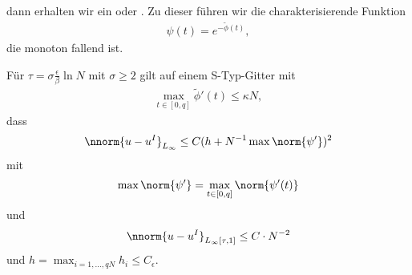 dann erhalten wir ein  oder . 
Zu dieser führen wir die charakterisierende Funktion
\begin{align*}
  \psi(t) = e^{- \tilde \phi (t)}, 
\end{align*}
die monoton fallend ist. 
\begin{folgerung}\label{6-13}
Für $\tau = \sigma \frac \epsilon \beta \ln N$ mit $\sigma \geq 2$ gilt auf einem S-Typ-Gitter mit
\begin{align*}
  \max_{t \in [0, q]} \tilde \phi'(t) \leq \kappa N,
\end{align*}
dass
\begin{align*}
  \nnorm{u - u^{I}}_{L_{\infty}} \leq C ( h + N^{-1} \max \norm{\psi'})^{2}  
\end{align*}
mit
\begin{align*}
  \max \norm{\psi'} =   \max_{t \in [0, q]} \norm{\psi'(t)} 
\end{align*}
und
\begin{align*}
  \nnorm{u - u^{I}}_{L_{\infty}[\tau, 1]} \leq C \cdot N^{-2}
\end{align*}
und $h = \max_{i = 1, \dots, q N} h_{i} \leq C_{\epsilon}$.  
\end{folgerung}
